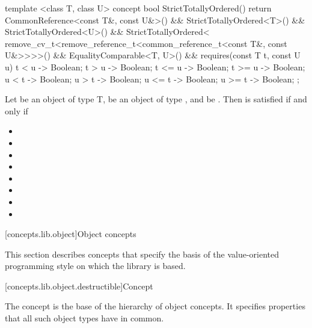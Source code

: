 \begin{itemdecl}
template <class T, class U>
concept bool StrictTotallyOrdered() {
  return CommonReference<const T&, const U&>() &&
    StrictTotallyOrdered<T>() &&
    StrictTotallyOrdered<U>() &&
    StrictTotallyOrdered<
      remove_cv_t<remove_reference_t<common_reference_t<const T&, const U&>>>>() &&
    EqualityComparable<T, U>() &&
    requires(const T t, const U u) {
      { t < u } -> Boolean;
      { t > u } -> Boolean;
      { t <= u } -> Boolean;
      { t >= u } -> Boolean;
      { u < t } -> Boolean;
      { u > t } -> Boolean;
      { u <= t } -> Boolean;
      { u >= t } -> Boolean;
    };
}
\end{itemdecl}

\begin{itemdescr}
\pnum
Let  be an object of type T,  be an object
of type , and  be
.
Then  is satisfied if and only if

\begin{itemize}
\item {}
\item {}
\item {}
\item {}
\item {}
\item {}
\item {}
\item {}
\end{itemize}
\end{itemdescr}

[concepts.lib.object]{Object concepts}

\pnum
This section describes concepts that specify the basis of the
value-oriented programming style on which the library is based.

[concepts.lib.object.destructible]{Concept }

\pnum
The  concept is the base of the hierarchy of object concepts.
It specifies properties that all such object types have in common.

